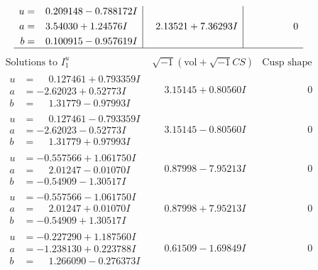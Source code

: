 \documentclass[1p]{elsarticle_modified}
\theoremstyle{definition}
\newcommand{\I}{\sqrt{-1}}
\begin{document}
$$\begin{array}{c|c|c}
\begin{aligned}
u &= \phantom{-}0.209148 - 0.788172 I \\
a &= \phantom{-}3.54030 + 1.24576 I \\
b &= \phantom{-}0.100915 - 0.957619 I\end{aligned}
 & \phantom{-}2.13521 + 7.36293 I & \phantom{-0.000000 } 0\\
 \hline 
 \end{array}$$\newpage$$\begin{array}{c|c|c}  
\text{Solutions to }I^u_{1}& \I (\text{vol} + \sqrt{-1}CS) & \text{Cusp shape}\\
 \hline 
\begin{aligned}
u &= \phantom{-}0.127461 + 0.793359 I \\
a &= -2.62023 + 0.52773 I \\
b &= \phantom{-}1.31779 - 0.97993 I\end{aligned}
 & \phantom{-}3.15145 + 0.80560 I & \phantom{-0.000000 } 0 \\ \hline\begin{aligned}
u &= \phantom{-}0.127461 - 0.793359 I \\
a &= -2.62023 - 0.52773 I \\
b &= \phantom{-}1.31779 + 0.97993 I\end{aligned}
 & \phantom{-}3.15145 - 0.80560 I & \phantom{-0.000000 } 0 \\ \hline\begin{aligned}
u &= -0.557566 + 1.061750 I \\
a &= \phantom{-}2.01247 - 0.01070 I \\
b &= -0.54909 - 1.30517 I\end{aligned}
 & \phantom{-}0.87998 - 7.95213 I & \phantom{-0.000000 } 0 \\ \hline\begin{aligned}
u &= -0.557566 - 1.061750 I \\
a &= \phantom{-}2.01247 + 0.01070 I \\
b &= -0.54909 + 1.30517 I\end{aligned}
 & \phantom{-}0.87998 + 7.95213 I & \phantom{-0.000000 } 0 \\ \hline\begin{aligned}
u &= -0.227290 + 1.187560 I \\
a &= -1.238130 + 0.223788 I \\
b &= \phantom{-}1.266090 - 0.276373 I\end{aligned}
 & \phantom{-}0.61509 - 1.69849 I & \phantom{-0.000000 } 0 \\ \hline\begin{aligned}

\end{aligned}
\end{array}$$
\end{document}
